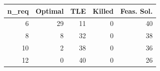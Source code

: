 
\begin{tabular}{rrrrr}
\toprule
n\_req & Optimal & TLE & Killed & Feas. Sol.\\
\midrule
6 & 29 & 11 & 0 & 40\\
8 & 8 & 32 & 0 & 38\\
10 & 2 & 38 & 0 & 36\\
12 & 0 & 40 & 0 & 26\\
\bottomrule
\end{tabular}

